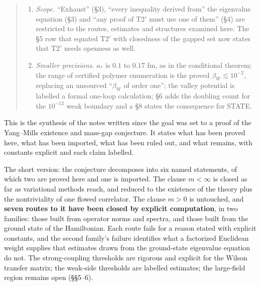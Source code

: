 \documentclass[11pt,a4paper]{article}
\begin{document}
\begin{quote}
\begin{enumerate}
  Kogut--Susskind Hamiltonian the volume-uniform gap rests on Yarotsky's
  existential threshold; a repository proof-extraction estimate of
  \(g_0^2\) of order \(10^{102}\) is heuristic; the explicit
  \(g^2\ge388\) is withdrawn. The weak side carries two labelled
  estimates: a necessary window \(1/g^2\gtrsim10^2\) with crude
  constants, and a one-step remainder threshold \(g^2\sim10^{-12}\) that
  assumes an unproved order-one propagator decay rate (\(\sim10^{-35}\)
  at the proved rate).
\item
  \emph{Scope.} ``Exhaust'' (§3), ``every inequality derived from'' the
  eigenvalue equation (§3) and ``any proof of T2\('\) must use one of
  them'' (§4) are restricted to the routes, estimates and structures
  examined here. The §5 row that equated T2\('\) with closedness of the
  gapped set now states that T2\('\) needs openness as well.
\item
  \emph{Smaller precisions.} \(a_*\) is \(0.1\) to \(0.17\) fm, as in
  the conditional theorem; the range of certified polymer enumeration is
  the proved \(\beta_W\lesssim10^{-2}\), replacing an unsourced
  ``\(\beta_W\) of order one''; the valley potential is labelled a
  formal one-loop calculation; §6 adds the doubling count for the
  \(10^{-12}\) weak boundary and a §8 states the consequence for STATE.
\end{enumerate}
\end{quote}

This is the synthesis of the notes written since the goal was set to a
proof of the Yang--Mills existence and mass-gap conjecture. It states
what has been proved here, what has been imported, what has been ruled
out, and what remains, with constants explicit and each claim labelled.

The short version: the conjecture decomposes into six named statements,
of which two are proved here and one is imported. The clause
\(m<\infty\) is closed as far as variational methods reach, and reduced
to the existence of the theory plus the nontriviality of one flowed
correlator. The clause \(m>0\) is untouched, and \textbf{seven routes to
it have been closed by explicit computation}, in two families: those
built from operator norms and spectra, and those built from the ground
state of the Hamiltonian. Each route fails for a reason stated with
explicit constants, and the second family's failure identifies what a
factorized Euclidean weight supplies that estimates drawn from the
ground-state eigenvalue equation do not. The strong-coupling thresholds
are rigorous and explicit for the Wilson transfer matrix; the weak-side
thresholds are labelled estimates; the large-field region remains open
(§§5--6).
\end{document}
